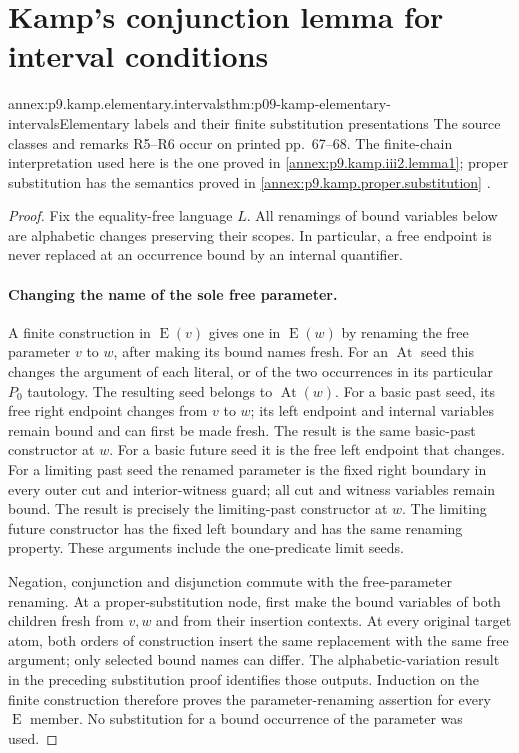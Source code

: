 
\section{Kamp's conjunction lemma for interval conditions}
\label{sec:annex-p09-kamp-iii2-lemma4}

\begin{annexitem}{annex:p9.kamp.elementary.intervals}{thm:p09-kamp-elementary-intervals}{Elementary labels and their finite substitution presentations}
The source classes and remarks R5--R6 occur on printed pp.~67--68.
The finite-chain interpretation used here is the one proved in
\cref{annex:p9.kamp.iii2.lemma1}; proper substitution has the semantics
proved in \cref{annex:p9.kamp.proper.substitution}
\cite[ch.~III, pp.~63--68]{Kamp1968}.

\begin{proof}
Fix the equality-free language \(L\). All renamings of bound variables
below are alphabetic changes preserving their scopes. In particular, a
free endpoint is never replaced at an occurrence bound by an internal
quantifier.

\paragraph{Changing the name of the sole free parameter.}
A finite construction in \(\operatorname{E}(v)\) gives one in
\(\operatorname{E}(w)\) by renaming the free parameter \(v\) to
\(w\), after making its bound names fresh. For an
\(\operatorname{At}\) seed this changes the argument of each literal,
or of the two occurrences in its particular \(P_0\) tautology.
The resulting seed belongs to \(\operatorname{At}(w)\).
For a basic past seed, its free right endpoint changes from \(v\) to
\(w\); its left endpoint and internal variables remain bound and can
first be made fresh. The result is the same basic-past constructor at
\(w\). For a basic future seed it is the free left endpoint that
changes. For a limiting past seed the renamed parameter is the fixed
right boundary in every outer cut and interior-witness guard; all cut
and witness variables remain bound. The result is precisely the
limiting-past constructor at \(w\). The limiting future constructor
has the fixed left boundary and has the same renaming property. These
arguments include the one-predicate limit seeds.

Negation, conjunction and disjunction commute with the free-parameter
renaming. At a proper-substitution node, first make the bound variables
of both children fresh from \(v,w\) and from their insertion contexts.
At every original target atom, both orders of construction insert the
same replacement with the same free argument; only selected bound names
can differ. The alphabetic-variation result in the preceding substitution
proof identifies those outputs. Induction on the finite construction
therefore proves the parameter-renaming assertion for every
\(\operatorname{E}\) member. No substitution for a bound occurrence
of the parameter was used.


\end{proof}
\end{annexitem}
